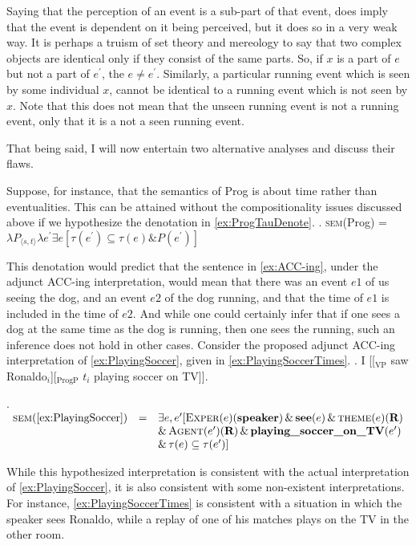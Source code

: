 \documentclass[MilwayThesis]{subfiles}
\begin{document}
Saying that the perception of an event is a sub-part of that event, does imply that the event is dependent on it being perceived, but it does so in a very weak way.
It is perhaps a truism of set theory and mereology to say that two complex objects are identical only if they consist of the same parts.
So, if $x$ is a part of $e$ but not a part of $e^{\prime}$, the $e \neq e^{\prime}$.
Similarly, a particular running event which is seen by some individual $x$, cannot be identical to a running event which is not seen by $x$.
Note that this does not mean that the unseen running event is not a running event, only that it is a not a seen running event.

That being said, I will now entertain two alternative analyses and discuss their flaws.

Suppose, for instance, that the semantics of Prog is about time rather than eventualities.
This can be attained without the compositionality issues discussed above if we hypothesize the denotation in \cref{ex:ProgTauDenote}.
\ex.\label{ex:ProgTauDenote} \textsc{sem}(Prog) = $\lambda P_{\langle s,t\rangle} \lambda e^{\prime} \exists e [\tau(e^{\prime}) \subseteq \tau(e) \& P(e^{\prime})]$

This denotation would predict that the sentence in \cref{ex:ACC-ing}, under the adjunct ACC-ing interpretation, would mean that there was an event $e1$ of us seeing the dog, and an event $e2$ of the dog running, and that the time of $e1$ is included in the time of $e2$.
And while one could certainly infer that if one sees a dog at the same time as the dog is running, then one sees the running, such an inference does not hold in other cases.
Consider the proposed adjunct ACC-ing interpretation of \cref{ex:PlayingSoccer}, given in \cref{ex:PlayingSoccerTimes}.
\ex.\label{ex:PlayingSoccer} I [[$_{\text{VP}}$ saw Ronaldo$_{i}$][$_{\text{ProgP}}$ $t_{i}$ playing soccer on TV]].

\ex.\label{ex:PlayingSoccerTimes} 
$\begin{array}{rcl}
	\textsc{sem}(\cref{ex:PlayingSoccer}) & =  & \exists e, e^{\prime} [\textsc{Exper}(e)(\textbf{speaker}) \,\&\, \textbf{see}(e) \,\&\, \textsc{theme}(e)(\textbf{R})\\
	& & \&\, \textsc{Agent}(e^{\prime})(\textbf{R}) \,\&\, \textbf{playing\_soccer\_on\_TV}(e^{\prime})\\
	& & \&\, \tau(e) \subseteq \tau(e^{\prime})] 
\end{array}$

While this hypothesized interpretation is consistent with the actual interpretation of \cref{ex:PlayingSoccer}, it is also consistent with some non-existent interpretations.
For instance, \cref{ex:PlayingSoccerTimes} is consistent with a situation in which the speaker sees Ronaldo, while a replay of one of his matches plays on the TV in the other room.
\end{document}
